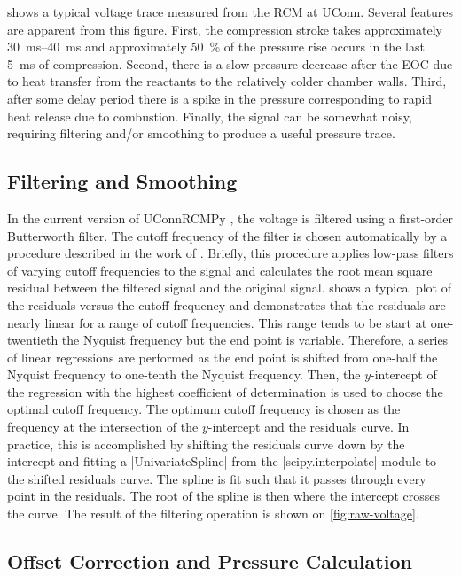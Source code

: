\documentclass[12pt]{../ussci}
\begin{document}
 shows a typical voltage trace measured from the RCM at
UConn. Several features are apparent from this figure. First, the compression
stroke takes approximately \SIrange{30}{40}{\ms} and approximately
\SI{50}{\percent} of the pressure rise occurs in the last \SI{5}{\ms} of
compression. Second, there is a slow pressure decrease after the EOC due to
heat transfer from the reactants to the relatively colder chamber walls. Third,
after some delay period there is a spike in the pressure corresponding to rapid
heat release due to combustion. Finally, the signal can be somewhat noisy,
requiring filtering and/or smoothing to produce a useful pressure trace.

\subsection{Filtering and Smoothing}\label{filtering-and-smoothing}

In the current version of UConnRCMPy \autocite{uconnrcmpy}, the voltage is
filtered using a first-order Butterworth filter. The cutoff frequency of the
filter is chosen automatically by a procedure described in the work of
\textcite{Yu1999}. Briefly, this procedure applies low-pass filters of
varying cutoff frequencies to the signal and calculates the root mean square
residual between the filtered signal and the original signal.
 shows a typical plot of the residuals versus the cutoff
frequency and demonstrates that the residuals are nearly linear for a range of
cutoff frequencies. This range tends to be start at one-twentieth the Nyquist
frequency but the end point is variable. Therefore, a series of linear
regressions are performed as the end point is shifted from one-half the
Nyquist frequency to one-tenth the Nyquist frequency. Then, the $y$-intercept
of the regression with the highest coefficient of determination is used to
choose the optimal cutoff frequency. The optimum cutoff frequency is chosen as
the frequency at the intersection of the $y$-intercept and the residuals curve.
In practice, this is accomplished by shifting the residuals curve down
by the intercept and fitting a \python|UnivariateSpline| from the
\python|scipy.interpolate| module \autocite{Jones2001} to the
shifted residuals curve. The spline is fit such that it passes through every
point in the residuals. The root of the spline is then where the intercept
crosses the curve. The result of the filtering operation is shown on
\cref{fig:raw-voltage}.

\subsection{Offset Correction and Pressure Calculation}\label{offset-correction-and-pressure-calculation}
\end{document}
